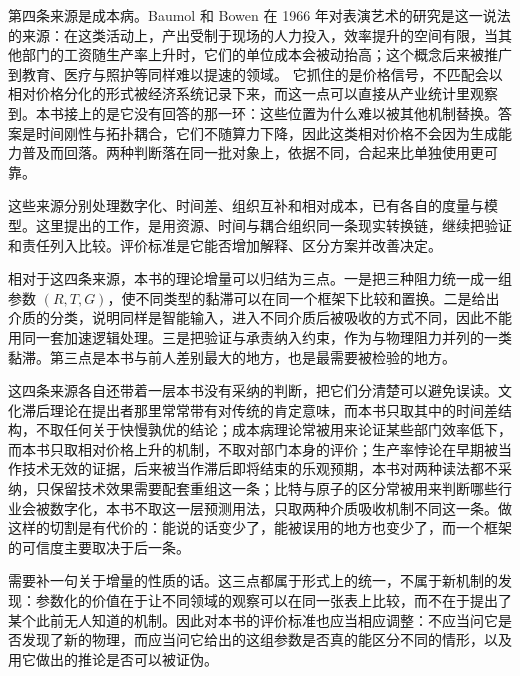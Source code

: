 第四条来源是成本病。Baumol 和 Bowen 在 1966 年对表演艺术的研究是这一说法的来源：在这类活动上，产出受制于现场的人力投入，效率提升的空间有限，当其他部门的工资随生产率上升时，它们的单位成本会被动抬高；这个概念后来被推广到教育、医疗与照护等同样难以提速的领域。\cite{baumol1966performing} 它抓住的是价格信号，不匹配会以相对价格分化的形式被经济系统记录下来，而这一点可以直接从产业统计里观察到。本书接上的是它没有回答的那一环：这些位置为什么难以被其他机制替换。答案是时间刚性与拓扑耦合，它们不随算力下降，因此这类相对价格不会因为生成能力普及而回落。两种判断落在同一批对象上，依据不同，合起来比单独使用更可靠。

这些来源分别处理数字化、时间差、组织互补和相对成本，已有各自的度量与模型。这里提出的工作，是用资源、时间与耦合组织同一条现实转换链，继续把验证和责任列入比较。评价标准是它能否增加解释、区分方案并改善决定。

相对于这四条来源，本书的理论增量可以归结为三点。一是把三种阻力统一成一组参数 $(R, T, G)$，使不同类型的黏滞可以在同一个框架下比较和置换。二是给出介质的分类，说明同样是智能输入，进入不同介质后被吸收的方式不同，因此不能用同一套加速逻辑处理。三是把验证与承责纳入约束，作为与物理阻力并列的一类黏滞。第三点是本书与前人差别最大的地方，也是最需要被检验的地方。

这四条来源各自还带着一层本书没有采纳的判断，把它们分清楚可以避免误读。文化滞后理论在提出者那里常常带有对传统的肯定意味，而本书只取其中的时间差结构，不取任何关于快慢孰优的结论；成本病理论常被用来论证某些部门效率低下，而本书只取相对价格上升的机制，不取对部门本身的评价；生产率悖论在早期被当作技术无效的证据，后来被当作滞后即将结束的乐观预期，本书对两种读法都不采纳，只保留技术效果需要配套重组这一条；比特与原子的区分常被用来判断哪些行业会被数字化，本书不取这一层预测用法，只取两种介质吸收机制不同这一条。做这样的切割是有代价的：能说的话变少了，能被误用的地方也变少了，而一个框架的可信度主要取决于后一条。

需要补一句关于增量的性质的话。这三点都属于形式上的统一，不属于新机制的发现：参数化的价值在于让不同领域的观察可以在同一张表上比较，而不在于提出了某个此前无人知道的机制。因此对本书的评价标准也应当相应调整：不应当问它是否发现了新的物理，而应当问它给出的这组参数是否真的能区分不同的情形，以及用它做出的推论是否可以被证伪。
